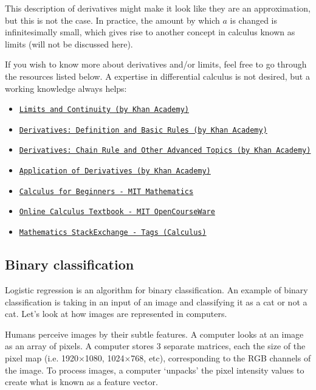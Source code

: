\documentclass{article}[a4paper,12pt]
\theoremstyle{definition}
\begin{document}
This description of derivatives might make it look like they are an approximation, but this is not the case. In practice, the amount by which $a$ is changed is infinitesimally small, which gives rise to another concept in calculus known as limits (will not be discussed here). 
\pagebreak

If you wish to know more about derivatives and/or limits, feel free to go through the resources listed below. A expertise in differential calculus is not desired, but a working knowledge always helps: 
\begin{itemize}
	\item \texttt{\href{https://www.khanacademy.org/math/calculus-1/cs1-limits-and-continuity}{Limits and Continuity (by Khan Academy)}}
	\item \texttt{\href{https://www.khanacademy.org/math/calculus-1/cs1-derivatives-definition-and-basic-rules}{Derivatives: Definition and Basic Rules (by Khan Academy)}}
	\item \texttt{\href{https://www.khanacademy.org/math/calculus-1/cs1-derivatives-chain-rule-and-other-advanced-topics}{Derivatives: Chain Rule and Other Advanced Topics (by Khan Academy)}}
	\item \texttt{\href{https://www.khanacademy.org/math/calculus-1/cs1-applications-of-derivatives}{Application of Derivatives (by Khan Academy)}}
	\item \texttt{\href{http://www-math.mit.edu/~djk/calculus_beginners/}{Calculus for Beginners - MIT Mathematics}}
	\item \texttt{\href{https://ocw.mit.edu/resources/res-18-001-calculus-online-textbook-spring-2005/textbook/}{Online Calculus Textbook - MIT OpenCourseWare}}
	\item \texttt{\href{https://math.stackexchange.com/questions/tagged/calculus}{Mathematics StackExchange - Tags (Calculus)}}
\end{itemize}

\subsection{Binary classification}
Logistic regression is an algorithm for binary classification. An example of binary classification is taking in an input of an image and classifying it as a cat or not a cat. Let's look at how images are represented in computers.
\vspace{6pt}

Humans perceive images by their subtle features. A computer looks at an image as an array of pixels. A computer stores 3 separate matrices, each the size of the pixel map (i.e. 1920$\times$1080, 1024$\times$768, etc), corresponding to the RGB channels of the image. To process images, a computer `unpacks' the pixel intensity values to create what is known as a feature vector. 
\end{document}
